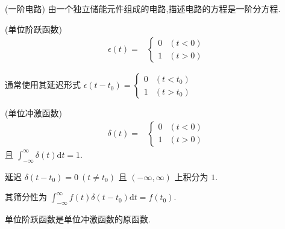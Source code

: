         \begin{definition}
            (一阶电路) 由一个独立储能元件组成的电路,描述电路的方程是一阶分方程.
        \end{definition}
        \begin{definition}
            (单位阶跃函数) 
            \begin{align}
                \epsilon(t)=&
                \begin{cases}
                    0 & (t<0)\\
                    1 & (t>0)
                \end{cases}\nonumber
            \end{align}
        \end{definition}
        通常使用其延迟形式 $\epsilon(t-t_0)=
        \begin{cases}
            0 & (t<t_0)\\
            1 & (t>t_0)
        \end{cases}$
        \begin{definition}
            (单位冲激函数) 
            \begin{align}
                \delta(t)=&
                \begin{cases}
                    0 & (t<0)\\
                    1 & (t>0)
                \end{cases}\nonumber
            \end{align}
            且 $\int_{-\infty}^{\infty}\delta(t)\mathrm{d}t=1$.
        \end{definition}
        延迟 $\delta(t-t_0)=0\ (t\ne t_0)$ 且 $(-\infty,\infty)$ 上积分为 $1$.
        
        其筛分性为 $\int_{-\infty}^{\infty}f(t)\delta(t-t_0)\mathrm{d}t=f(t_0)$.

        单位阶跃函数是单位冲激函数的原函数.

